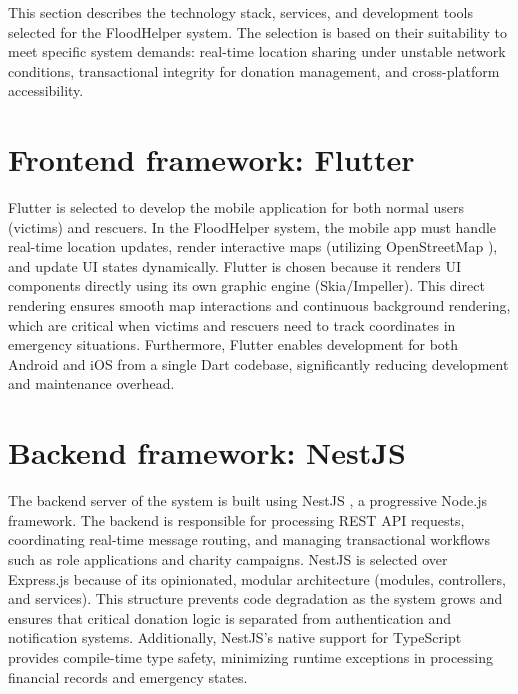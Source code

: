 \documentclass[../Main.tex]{subfiles}
\begin{document}
\label{sec:methodology}

This section describes the technology stack, services, and development tools selected for the FloodHelper system. The selection is based on their suitability to meet specific system demands: real-time location sharing under unstable network conditions, transactional integrity for donation management, and cross-platform accessibility.

\section{Frontend framework: Flutter}
Flutter \cite{flutterwebsite} is selected to develop the mobile application for both normal users (victims) and rescuers. In the FloodHelper system, the mobile app must handle real-time location updates, render interactive maps (utilizing OpenStreetMap \cite{osmwebsite}), and update UI states dynamically. Flutter is chosen because it renders UI components directly using its own graphic engine (Skia/Impeller). This direct rendering ensures smooth map interactions and continuous background rendering, which are critical when victims and rescuers need to track coordinates in emergency situations. Furthermore, Flutter enables development for both Android and iOS from a single Dart codebase, significantly reducing development and maintenance overhead.

\section{Backend framework: NestJS}
The backend server of the system is built using NestJS \cite{nestjswebsite}, a progressive Node.js \cite{nodejswebsite} framework. The backend is responsible for processing REST API requests, coordinating real-time message routing, and managing transactional workflows such as role applications and charity campaigns. NestJS is selected over Express.js \cite{expressjswebsite} because of its opinionated, modular architecture (modules, controllers, and services). This structure prevents code degradation as the system grows and ensures that critical donation logic is separated from authentication and notification systems. Additionally, NestJS's native support for TypeScript provides compile-time type safety, minimizing runtime exceptions in processing financial records and emergency states.
\end{document}
